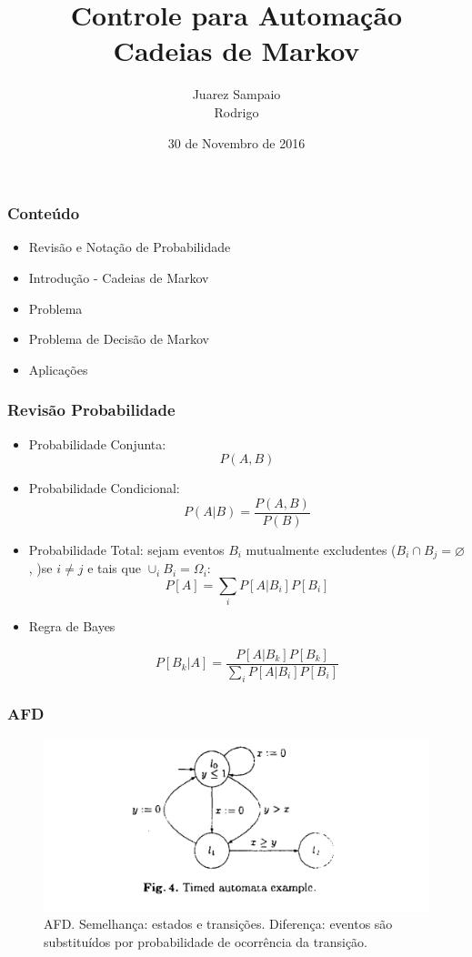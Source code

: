 \documentclass[brazil]{beamer}
\title{Controle para Automação \\ Cadeias de Markov}
\author{Juarez Sampaio \\ Rodrigo}
\institute{Universidade de Brasília}
\date{30 de Novembro de 2016}
\begin{document}
\begin{frame}
        \titlepage
\end{frame}

\begin{frame}[fragile]
  \frametitle{Conteúdo}
  \begin{itemize}
     \item Revisão e Notação de Probabilidade
     \item Introdução - Cadeias de Markov
     \item Problema
     \item Problema de Decisão de Markov
     \item Aplicações
  \end{itemize}
\end{frame}

\begin{frame}[fragile]
  \frametitle{Revisão Probabilidade}

  \begin{itemize}
      \item Probabilidade Conjunta: 
        $$ P (A, B)$$ 
      \item Probabilidade Condicional: 
        $$P ( A | B ) = \frac{P(A,B)}{P(B)}$$
      \item Probabilidade Total:
      sejam eventos $B_i$ mutualmente excludentes ($B_i \cap B_j = \varnothing$,
      )se $i \neq j$ e tais que $\cup _i B_i = \Omega_i$:
      $$ P[A] = \sum_i P[A | B_i] P[B_i]$$
      \item Regra de Bayes

        $$P[B_k | A] = \frac{P[A | B_k] P[B_k]}{\sum_i P[A | B_i] P[B_i]}$$
  \end{itemize}

\end{frame}
\begin{frame}
  \frametitle{AFD}
      \begin{figure}
        \centering
        \includegraphics[width = 1.0\textwidth, keepaspectratio]{./img/automata.png}
        \caption{AFD. Semelhança: estados e transições. Diferença: eventos são
          substituídos por probabilidade de ocorrência da transição.
          \cite{sample} }
      \end{figure}
\end{frame}

\begin{frame}
    {\footnotesize
    
    
    }
\end{frame}
\end{document}
